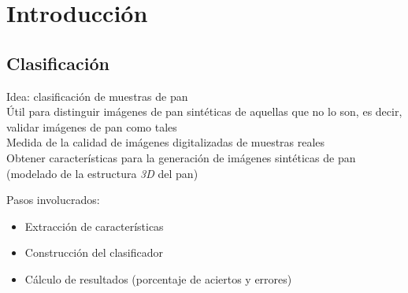 \documentclass{beamer}
\begin{document}

\section{Introducci\'on}

\subsection{Clasificaci\'on}

\begin{frame}
\begin{center}
{\huge Idea: clasificaci\'on de muestras de pan }\\
\vspace{10px}
{\large \'Util para distinguir im\'agenes de pan sint\'eticas de aquellas que no lo son, es decir, validar im\'agenes de pan como tales}\\
\vspace{10px}
{\large Medida de la calidad de im\'agenes digitalizadas de muestras reales}\\
{\large Obtener caracter\'isticas para la generaci\'on de im\'agenes sint\'eticas de pan (modelado de la estructura {\em 3D} del pan)}\\
\end{center}
\end{frame}

\begin{frame}
\begin{center}
{\huge Pasos involucrados: }\\
\begin{itemize}
\item Extracci\'on de caracter\'isticas
\item Construcci\'on del clasificador
\item C\'alculo de resultados (porcentaje de aciertos y errores)
\end{itemize}
\end{center}
\end{frame}
\end{document}
